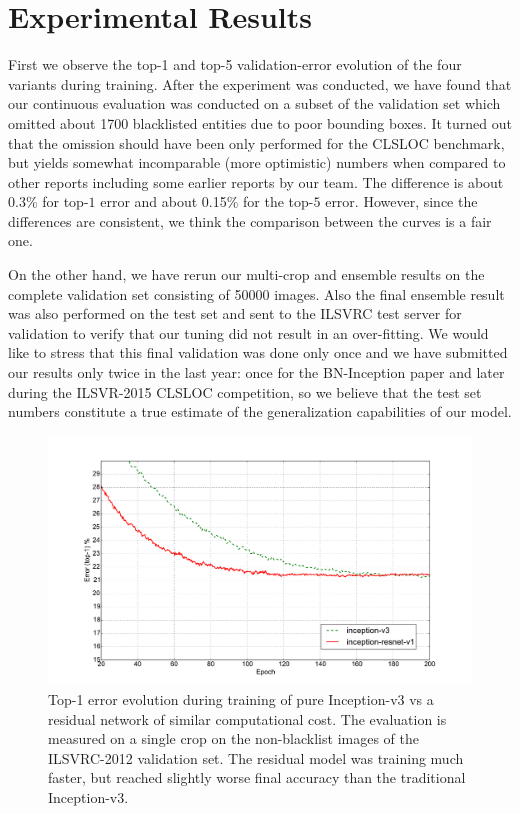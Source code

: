 \section{Experimental Results}

First we observe the top-1 and top-5 validation-error evolution of the
four variants during training. After the experiment was conducted, we have
found that our continuous evaluation was conducted on a subset of the
validation set which omitted about 1700 blacklisted entities due to poor
bounding boxes. It turned out that the omission should have been only performed
for the CLSLOC benchmark, but yields somewhat incomparable (more optimistic)
numbers when compared to other reports including some earlier reports by our
team. The difference is about 0.3\% for top-$1$ error and about 0.15\% for
the top-$5$ error. However, since the differences are consistent, we think
the comparison between the curves is a fair one.

On the other hand, we have rerun our multi-crop and ensemble results on the
complete validation set consisting of 50000 images. Also the final ensemble
result was also performed on the test set and sent to the ILSVRC test server
for validation to verify that our tuning did not result in an over-fitting.
We would like to stress that this final validation was done only once and we
have submitted our results only twice in the last year: once for the
BN-Inception paper and later during the ILSVR-2015 CLSLOC competition, so
we believe that the test set numbers constitute a true estimate of the
generalization capabilities of our model.

\begin{figure}
\centering
\includegraphics[width=\linewidth]{small_top1}
\caption{Top-1 error evolution during training of pure Inception-v3 vs a
  residual network of similar computational cost. The evaluation is measured on
  a single crop on the non-blacklist images of the ILSVRC-2012 validation set.
  The residual model was training much faster, but reached
  slightly worse final accuracy than the traditional Inception-v3.
}
\label{fig:smalltop1}
\end{figure}


